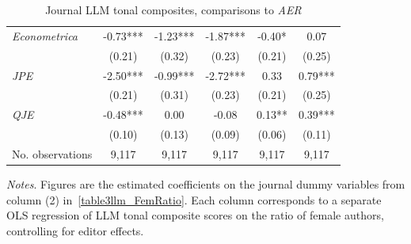 \begin{table}[H]
    \footnotesize
    \centering
    \begin{threeparttable}
        \caption{Journal LLM tonal composites, comparisons to \textit{AER}}
        \label{table3llm_journal}
        \begin{tabular}{p{3cm}S@{}S@{}S@{}S@{}S@{}}
            \toprule
            &{}&{}&{}&{}&{}\\
            \midrule
            \textit{Econometrica}         &       -0.73***&       -1.23***&       -1.87***&       -0.40*  &        0.07   \\
                                          &      (0.21)   &      (0.32)   &      (0.23)   &      (0.21)   &      (0.25)   \\
            \textit{JPE}                  &       -2.50***&       -0.99***&       -2.72***&        0.33   &        0.79***\\
                                          &      (0.21)   &      (0.31)   &      (0.23)   &      (0.21)   &      (0.25)   \\
            \textit{QJE}                  &       -0.48***&        0.00   &       -0.08   &        0.13** &        0.39***\\
                                          &      (0.10)   &      (0.13)   &      (0.09)   &      (0.06)   &      (0.11)   \\
            \midrule
            No. observations              &       9,117   &       9,117   &       9,117   &       9,117   &       9,117   \\
            \bottomrule
        \end{tabular}
        \begin{tablenotes}
            \tiny
            \item \textit{Notes}. Figures are the estimated coefficients on the journal dummy variables from column (2) in~\autoref{table3llm_FemRatio}. Each column corresponds to a separate OLS regression of LLM tonal composite scores on the ratio of female authors, controlling for editor effects.
        \end{tablenotes}
    \end{threeparttable}
\end{table}